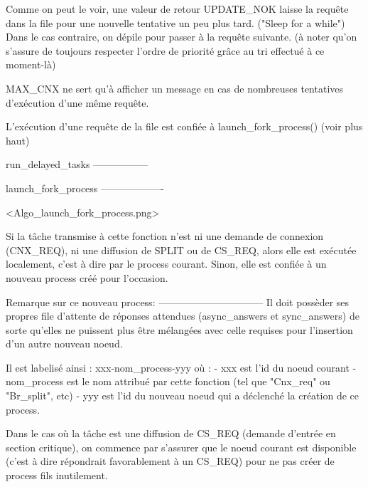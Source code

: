 Comme on peut le voir, une valeur de retour UPDATE_NOK laisse la requête dans la file pour une nouvelle tentative un peu
plus tard. ("Sleep for a while") Dans le cas contraire, on dépile pour passer à la requête suivante. (à noter qu'on
s'assure de toujours respecter l'ordre de priorité grâce au tri effectué à ce moment-là)

MAX_CNX ne sert qu'à afficher un message en cas de nombreuses tentatives d'exécution d'une même requête.

L'exécution d'une requête de la file est confiée à launch_fork_process() (voir plus haut)

run_delayed_tasks
-----------------


launch_fork_process
-------------------

<Algo_launch_fork_process.png>

Si la tâche transmise à cette fonction n'est ni une demande de connexion
(CNX_REQ), ni une diffusion de SPLIT ou de CS_REQ, alors elle est exécutée
localement, c'est à dire par le process courant.
Sinon, elle est confiée à un nouveau process créé pour l'occasion.

Remarque sur ce nouveau process:
--------------------------------
Il doit possèder ses propres file d'attente de réponses attendues (async_answers
et sync_answers) de sorte qu'elles ne puissent plus être mélangées avec celle
requises pour l'insertion d'un autre nouveau noeud.

Il est labelisé ainsi : xxx-nom_process-yyy où :
  - xxx est l'id du noeud courant
  - nom_process est le nom attribué par cette fonction (tel que "Cnx_req" ou "Br_split", etc)
  - yyy est l'id du nouveau noeud qui a déclenché la création de ce process.

Dans le cas où la tâche est une diffusion de CS_REQ (demande d'entrée en section
critique), on commence par s'assurer que le noeud courant est disponible (c'est
à dire répondrait favorablement à un CS_REQ) pour ne pas créer de process fils
inutilement.
